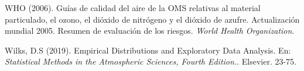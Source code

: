 \documentclass[12pt]{article}
\begin{document}
\begin{thebibliography}{99}
 WHO (2006). Guías de calidad del aire de la OMS relativas al material particulado, el ozono, el dióxido de nitrógeno y el dióxido de azufre. Actualización mundial 2005. Resumen de evaluación de los riesgos. \textit{World Health Organization}.

 Wilks, D.S (2019). Empirical Distributions and Exploratory Data Analysis. En: \textit{Statistical Methods in the Atmospheric Sciences, Fourth Edition.}. Elsevier. 23-75.

\end{thebibliography}
\end{document}
